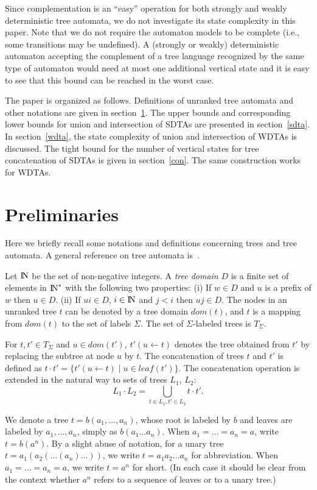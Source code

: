 \documentclass[copyright]{eptcs}
\begin{document}
Since complementation is an ``easy'' operation for both strongly
and weakly deterministic tree automata, we do not investigate its
state complexity in this paper. Note that we do not require the
automaton models to be complete (i.e., some transitions may be
undefined). A (strongly or weakly) deterministic automaton
accepting the complement of a tree language recognized by the same
type of automaton would need at most one additional vertical state
and it is easy to see that this bound can be reached in the worst
case.

The  paper is organized as follows. Definitions of
unranked tree automata and other notations are given in
section~\ref{pre}. The upper bounds and corresponding
lower bounds  for union and
intersection of SDTAs are presented in section~\ref{sdta}. In
section~\ref{wdta}, the state complexity of union and
intersection of WDTAs is discussed. The tight bound for the
number of vertical
states for tree concatenation of SDTAs is
given in section~\ref{con}. The same construction works for
WDTAs.


\section{Preliminaries}\label{pre}

Here we briefly recall some notations and definitions concerning
trees and tree automata. A general reference on tree automata
is~\cite{CDG}.

Let ${\rm I\!N}$ be the set of non-negative integers. A {\em tree
domain} $D$ is a finite set of elements in ${\rm I\!N}^*$ with the
following two properties: (i) If $w\in D$ and $u$ is a prefix of
$w$ then $u\in D$. (ii) If $ui \in D$, $i\in {\rm I\!N}$ and $j<i$ then
$uj \in D$. The nodes in an unranked tree $t$ can be denoted by a
tree domain $dom(t)$, and $t$ is a mapping from $dom(t)$ to the
set of labels $\Sigma$. The set of $\Sigma$-labeled trees is
$T_\Sigma$.

For $t,t'\in T_\Sigma$ and $u \in dom(t')$, $t'(u\leftarrow t)$
denotes the tree obtained from $t'$ by replacing the subtree at
node $u$ by $t$. The concatenation of trees $t$ and $t'$ is
defined as
$t\cdot t' = \{t'(u\leftarrow t)\mid u\in
leaf(t')\}$.
The concatenation operation is extended in the
natural way to sets of trees $L_1$, $L_2$: $$L_1\cdot L_2 =
\bigcup_{t\in L_1, t'\in L_2} t\cdot t'.$$

We denote a tree $t = b ( a_1, \ldots ,a_n )$, whose root is
labeled by $b$ and leaves are labeled by $ a_1, \ldots ,a_n $,
simply as $b ( a_1 \ldots a_n)$. When $a_1= \ldots =a_n=a$, write
$t=b(a^n)$. By a slight abuse of notation, for a unary tree $t =
a_1 ( a_2 ( \ldots (a_n)\ldots)) $, we write $t = a_1 a_2 \ldots
a_n$ for abbreviation. When $a_1= \ldots =a_n=a$, we write $t=a^n$
for short. (In each case it should be clear from the context
whether $a^n$ refers to a sequence of leaves or to a unary tree.)
\end{document}
